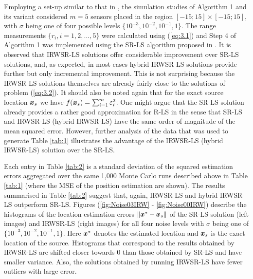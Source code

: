 
Employing a set-up similar to that in \cite{BeckStLi}, the simulation studies of Algorithm 1 and its variant considered $m = 5$ sensors placed in the region $[-15;15]\times[-15;15]$, with $\sigma$ being one of four possible levels $\{10^{-3}, 10^{-2}, 10^{-1}, 1\}$. The range measurements $\{r_i, i=1, 2,\ldots,5\}$ were calculated using (\ref{eq:3.1}) and Step 4 of Algorithm 1 was implemented using the SR-LS algorithm proposed in \cite{BeckStLi}. It is observed that IRWSR-LS solutions offer considerable improvement over SR-LS solutions, and, as expected, in most cases hybrid IRWSR-LS solutions provide further but only incremental improvement. This is not surprising because the IRWSR-LS solutions themselves are already fairly close to the solutions of problem (\ref{eq:3.2}). It should also be noted again that for the exact source location $\mbox{\boldmath$x$}_s$ we have $f(\mbox{\boldmath$x$}_s) = \sum_{i=1}^m \varepsilon_i^2$. One might argue that the SR-LS solution already provides a rather good approximation for R-LS in the sense that SR-LS and IRWSR-LS (hybrid IRWSR-LS) have the same order of magnitude of the mean squared error. However, further analysis of the data that was used to generate Table \ref{tab:1} illustrates the advantage of the IRWSR-LS (hybrid IRWSR-LS) solution over the SR-LS.

Each entry in Table \ref{tab:2} is a standard deviation of the squared  estimation errors  aggregated over the  same 1,000 Monte Carlo runs described above in Table \ref{tab:1} (where the MSE of the position estimation are shown). The results summarised in Table \ref{tab:2} suggest that, again, IRWSR-LS and hybrid IRWSR-LS outperform SR-LS. Figures (\ref{fig:Noise03IRW} - \ref{fig:Noise00IRW}) describe the histograms of the location estimation errors $\|\mbox{\boldmath$x$}^* - \mbox{\boldmath$x$}_s\|$ of the SR-LS solution (left images) and IRWSR-LS (right images) for all four noise levels with $\sigma$ being one of $\{10^{-3}, 10^{-2}, 10^{-1}, 1\}$. Here $\mbox{\boldmath$x$}^*$ denotes the estimated location and $\mbox{\boldmath$x$}_s$ is the exact location of the source. Histograms that correspond to the results obtained by IRWSR-LS are shifted closer towards $0$ than those obtained by SR-LS and have smaller variance. Also, the solutions obtained by running IRWSR-LS have fewer outliers with large error.



